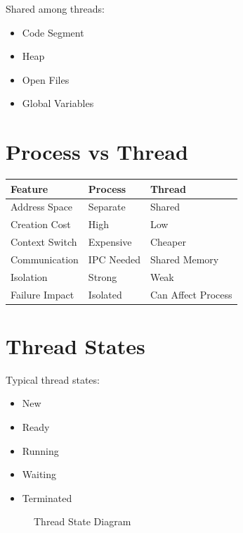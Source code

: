Shared among threads:

\begin{itemize}
\item Code Segment
\item Heap
\item Open Files
\item Global Variables
\end{itemize}

\section{Process vs Thread}

\begin{longtable}{|p{4cm}|p{5cm}|p{5cm}|}
\hline
Feature & Process & Thread \\
\hline
Address Space & Separate & Shared \\
\hline
Creation Cost & High & Low \\
\hline
Context Switch & Expensive & Cheaper \\
\hline
Communication & IPC Needed & Shared Memory \\
\hline
Isolation & Strong & Weak \\
\hline
Failure Impact & Isolated & Can Affect Process \\
\hline
\end{longtable}

\section{Thread States}

Typical thread states:

\begin{itemize}
\item New
\item Ready
\item Running
\item Waiting
\item Terminated
\end{itemize}

\begin{figure}[H]
\centering
{}
\caption{Thread State Diagram}
\end{figure}

